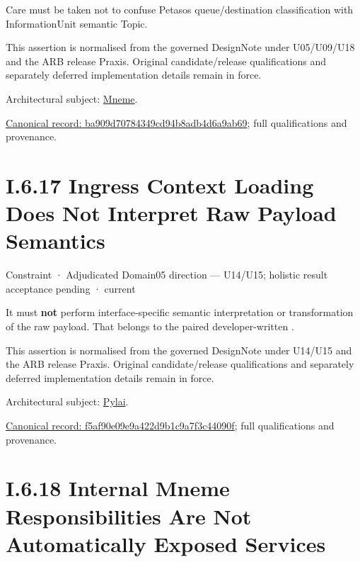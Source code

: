Care must be taken not to confuse Petasos queue/destination classification with InformationUnit semantic Topic.



This assertion is normalised from the governed DesignNote under U05/U09/U18 and the ARB release Praxis. Original candidate/release qualifications and separately deferred implementation details remain in force.



Architectural subject: \hyperref[element:1af8a56358f7429fabfb57be66542a99]{Mneme}.


{\footnotesize \href{../../../../continuum/motivation/constraint/ba909d70784349cd94b8adb4d6a9ab69.md}{Canonical record: ba909d70784349cd94b8adb4d6a9ab69}; full qualifications and provenance.}\par
\section*{I.6.17 Ingress Context Loading Does Not Interpret Raw Payload Semantics}
\label{navigation:I.6.17}

\label{element:f5af90e09e9a422d9b1c9a7f3c44090f}
{\small Constraint · Adjudicated Domain05 direction — U14/U15; holistic result acceptance pending · current}\par

It must \textbf{not} perform interface-specific semantic interpretation or transformation of the raw payload. That belongs to the paired developer-written \texttt{}.



This assertion is normalised from the governed DesignNote under U14/U15 and the ARB release Praxis. Original candidate/release qualifications and separately deferred implementation details remain in force.



Architectural subject: \hyperref[element:e3e4147fea3640198dc251ed41ee854d]{Pylai}.


{\footnotesize \href{../../../../continuum/motivation/constraint/f5af90e09e9a422d9b1c9a7f3c44090f.md}{Canonical record: f5af90e09e9a422d9b1c9a7f3c44090f}; full qualifications and provenance.}\par
\section*{I.6.18 Internal Mneme Responsibilities Are Not Automatically Exposed Services}
\label{navigation:I.6.18}

